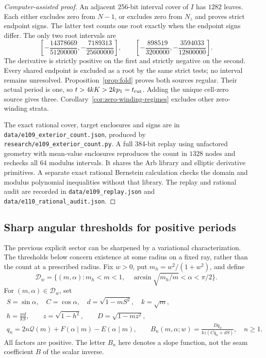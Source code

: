 \documentclass[11pt,a4paper]{article}
\theoremstyle{remark}\newtheorem{remark}[theorem]{Remark}
\begin{document}
\begin{proof}[Computer-assisted proof]
An adjacent 256-bit interval cover of $I$ has $1282$ leaves.
Each either excludes zero from $N-1$, or excludes zero from $N_z$
and proves strict endpoint signs. The latter test counts one root
exactly when the endpoint signs differ. The only two root intervals are
\[
 \left[-\frac{14378669}{51200000},-\frac{7189313}{25600000}\right],
 \qquad
 \left[-\frac{898519}{3200000},-\frac{3594033}{12800000}\right].
\]
The derivative is strictly positive on the first and strictly negative
on the second. Every shared endpoint is excluded as a root by the
same strict tests; no interval remains unresolved.
Proposition~\ref{prop:fold} proves both sources regular.
Their actual period is one, so $t>4kK>2kp_1=t_{\rm cut}$.
Adding the unique cell-zero source gives three.
Corollary~\ref{cor:zero-winding-regimes} excludes other zero-winding strata.

The exact rational cover, target enclosures and signs are in
\nolinkurl{data/e109_exterior_count.json}, produced by
\nolinkurl{research/e109_exterior_count.py}.
A full 384-bit replay using unfactored geometry with mean-value
enclosures reproduces the count in $1328$ nodes and rechecks all
$64$ modulus intervals. It shares the Arb library and elliptic derivative
primitives. A separate exact rational Bernstein calculation checks the
domain and modulus polynomial inequalities without that library.
The replay and rational audit are recorded in
\nolinkurl{data/e109_replay.json} and
\nolinkurl{data/e110_rational_audit.json}.
\end{proof}


\subsection{Sharp angular thresholds for positive periods}
\label{sec:exterior-thresholds}

The previous explicit sector can be sharpened by a variational
characterization. The thresholds below concern existence at some radius
on a fixed ray, rather than the count at a prescribed radius.
Fix $w>0$, put $m_h=w^2/(1+w^2)$, and define
\[
 \mathcal D_w=\{(m,\alpha):m_h<m<1,\quad
       \arcsin\sqrt{m_h/m}<\alpha<\pi/2\}.
\]
For $(m,\alpha)\in\mathcal D_w$, set
\[
 \begin{gathered}
 S=\sin\alpha,\quad C=\cos\alpha,\quad d=\sqrt{1-mS^2},
 \quad k=\sqrt m,\\
 h=\frac{wd}{kS},\qquad z=\sqrt{1-h^2},\qquad D=\sqrt{1-mz^2},\\
 q_n=2n\mathcal Q(m)+F(\alpha\mid m)-E(\alpha\mid m),\qquad
 B_n(m,\alpha;w)=\frac{Dq_n}{kz(Cq_n+dS)},\quad n\ge1.
 \end{gathered}
\]
All factors are positive. The letter $B_n$ here denotes a slope function,
not the seam coefficient $B$ of the scalar inverse.
\end{document}
